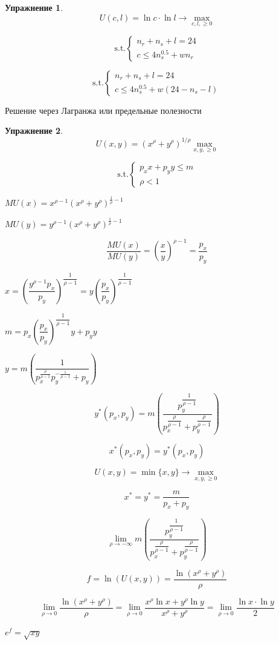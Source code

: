 \documentclass[reqno]{article}
\theoremstyle{definition}
\theoremstyle{definition}
\theoremstyle{definition}
\theoremstyle{definition}
\theoremstyle{definition}
\newtheorem{exc}{Упражнение}[section]
\theoremstyle{definition}
\theoremstyle{definition}
\theoremstyle{definition}
\theoremstyle{definition}
\begin{document}
	\begin{exc}
		$$U(c,l)=\ln c \cdot \ln l \rightarrow \max\limits_{c,l,\geq 0}$$
		
		$$
		\text{s.t.}
		\begin{cases}
			n_r + n_s + l = 24 \\
			
			c \leq 4 n_s^{0.5} + w n_r
		\end{cases}
		$$
		
		$$
		\text{s.t.}
		\begin{cases}
			n_r + n_s + l = 24\\
			
			c \leq 4 n_s^{0.5} + w (24 -n_s-l)
		\end{cases}
		$$
		
		Решение через Лагранжа или предельные полезности
		
	\end{exc}
	
	\begin{exc}
		$$U(x,y)=(x^\rho + y^\rho)^{1/\rho} \max\limits_{x,y,\geq 0}$$
		
		$$
		\text{s.t.}
		\begin{cases}
			p_x x + p_y y \leq m \\
			
			\rho < 1
		\end{cases}
		$$
		
		$MU(x) = x^{\rho-1} (x^\rho + y^\rho)^{\frac{1}{\rho}-1}$
		
		$MU(y) = y^{\rho-1} (x^\rho + y^\rho)^{\frac{1}{\rho}-1}$
		
		$$\dfrac{MU(x)}{MU(y)} = \left( \dfrac{x}{y}\right)^{\rho-1} = \dfrac{p_x}{p_y}$$
		
		$x = \left( \dfrac{y^{\rho-1} p_x}{p_y}\right)^{\dfrac{1}{\rho-1}} = y \left( \dfrac{p_x}{p_y}\right)^{\dfrac{1}{\rho-1}}$
		
		$m = p_x \left( \dfrac{p_x}{p_y}\right)^{\dfrac{1}{\rho-1}} y + p_y y$
		
		$y=m \left(\dfrac{1}{p_x^{\frac{\rho}{\rho-1}} p_y^{- \frac{1}{\rho-1}} + p_y}\right)$
				
		$$y^*(p_x,p_y) = m \left( \dfrac{p_y^{\dfrac{1}{\rho-1}}}{p_x^{\dfrac{\rho}{\rho-1}}+p_y^{\dfrac{\rho}{\rho-1}}}\right)$$
		
		$$x^*(p_x,p_y) = y^*(p_x,p_y)$$	%
		
		$$U(x,y) = \min\{x,y\} \rightarrow \max\limits_{x,y,\geq 0}$$
		
		$$x^*=y^*=\dfrac{m}{p_x+p_y}$$
		
		$$\lim_{\rho \rightarrow - \infty} m \left( \dfrac{p_y^{\dfrac{1}{\rho-1}}}{p_x^{\dfrac{\rho}{\rho-1}}+p_y^{\dfrac{\rho}{\rho-1}}}\right)$$
		
		$$f=\ln(U(x,y)) = \dfrac{\ln(x^\rho + y^\rho)}{\rho}$$
		
		$$\lim_{\rho \rightarrow 0} \dfrac{\ln(x^\rho + y^\rho)}{\rho} =\lim_{\rho \rightarrow 0} \dfrac{x^\rho \ln x +y^\rho \ln y}{x^\rho + y^\rho} = \lim_{\rho \rightarrow 0} \dfrac{\ln x \cdot \ln y}{2}$$
		
		$e^f=\sqrt{xy}$
		
	\end{exc}
\end{document}
